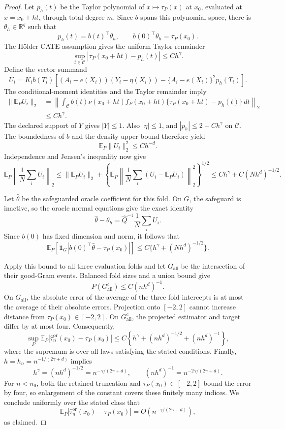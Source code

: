 \documentclass{article}
\begin{document}
\begin{proof}
Let \(p_h(t)\) be the Taylor polynomial of \(x\mapsto\tau_P(x)\) at \(x_0\), evaluated at \(x=x_0+ht\), through total degree \(m\).  Since \(b\) spans this polynomial space, there is \(\theta_h\in\mathbb R^q\) such that
\[
p_h(t)=b(t)^\top\theta_h,
\qquad
b(0)^\top\theta_h=\tau_P(x_0).
\]
The H\"older CATE assumption gives the uniform Taylor remainder
\[
\sup_{t\in\mathcal C}
|\tau_P(x_0+ht)-p_h(t)|\leq Ch^\gamma.
\]
Define the vector summand
\[
U_i=K_i b(T_i)\left[
(A_i-e(X_i))(Y_i-\eta(X_i))
-\{A_i-e(X_i)\}^2p_h(T_i)
\right].
\]
The conditional-moment identities and the Taylor remainder imply
\[
\begin{aligned}
\lVert\mathbb E_P U_i\rVert_2
&=\left\lVert
\int_{\mathcal C}b(t)\nu(x_0+ht)f_P(x_0+ht)
\{\tau_P(x_0+ht)-p_h(t)\}\,dt
\right\rVert_2\\
&\leq Ch^\gamma.
\end{aligned}
\]
The declared support of \(Y\) gives \(|Y|\leq1\).  Also \(|\eta|\leq1\), and \(|p_h|\leq2+Ch^\gamma\) on \(\mathcal C\).  The boundedness of \(b\) and the density upper bound therefore yield
\[
\mathbb E_P\lVert U_i\rVert_2^2\leq Ch^{-d}.
\]
Independence and Jensen's inequality now give
\[
\mathbb E_P\left\lVert\frac1N\sum_iU_i\right\rVert_2
\leq
\lVert\mathbb E_PU_i\rVert_2
+\left\{
\mathbb E_P\left\lVert
\frac1N\sum_i(U_i-\mathbb E_PU_i)
\right\rVert_2^2
\right\}^{1/2}
\leq Ch^\gamma+C(Nh^d)^{-1/2}.
\]

Let \(\widehat\theta\) be the safeguarded oracle coefficient for this fold.  On \(G\), the safeguard is inactive, so the oracle normal equations give the exact identity
\[
\widehat\theta-\theta_h
=\widehat Q^{-1}\frac1N\sum_iU_i.
\]
Since \(b(0)\) has fixed dimension and norm, it follows that
\[
\mathbb E_P\!\left[
\mathbf 1_G
\left|b(0)^\top\widehat\theta-\tau_P(x_0)\right|
\right]
\leq C\{h^\gamma+(Nh^d)^{-1/2}\}.
\]

Apply this bound to all three evaluation folds and let \(G_{\mathrm{all}}\) be the intersection of their good-Gram events.  Balanced fold sizes and a union bound give
\[
P(G_{\mathrm{all}}^c)\leq C(nh^d)^{-1}.
\]
On \(G_{\mathrm{all}}\), the absolute error of the average of the three fold intercepts is at most the average of their absolute errors.  Projection onto \([-2,2]\) cannot increase distance from \(\tau_P(x_0)\in[-2,2]\).  On \(G_{\mathrm{all}}^c\), the projected estimator and target differ by at most four.  Consequently,
\[
\sup_P
\mathbb E_P\left|
\widehat\tau_n^{\mathrm{or}}(x_0)-\tau_P(x_0)
\right|
\leq
C\left\{h^\gamma+(nh^d)^{-1/2}+(nh^d)^{-1}\right\},
\]
where the supremum is over all laws satisfying the stated conditions.  Finally, \(h=h_n=n^{-1/(2\gamma+d)}\) implies
\[
h^\gamma=(nh^d)^{-1/2}=n^{-\gamma/(2\gamma+d)},
\qquad
(nh^d)^{-1}=n^{-2\gamma/(2\gamma+d)}.
\]
For \(n<n_0\), both the retained truncation and \(\tau_P(x_0)\in[-2,2]\) bound the error by four, so enlargement of the constant covers these finitely many indices.  We conclude uniformly over the stated class that
\[
\mathbb E_P\left|
\widehat\tau_n^{\mathrm{or}}(x_0)-\tau_P(x_0)
\right|
=O\!\left(n^{-\gamma/(2\gamma+d)}\right),
\]
as claimed.
\end{proof}
\end{document}
